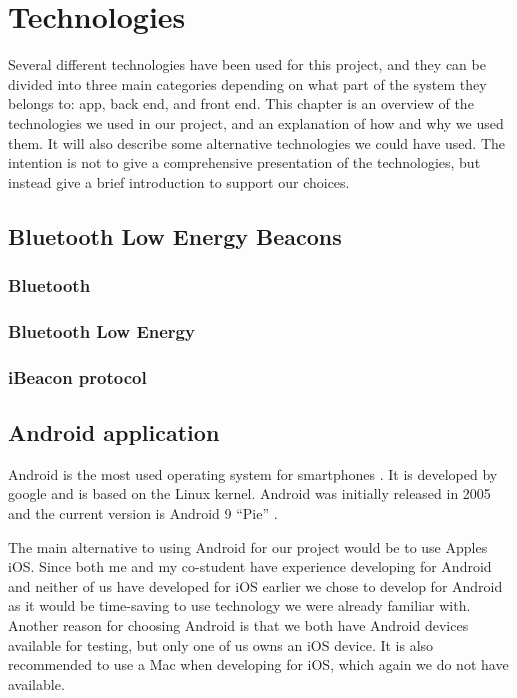 \documentclass[../Main/thesis.tex]{subfiles}
\begin{document}
\chapter{Technologies}
\label{ch:technologies}

Several different technologies have been used for this project, and they can be divided into three main categories depending on what part of the system they belongs to: app, back end, and front end.
This chapter is an overview of the technologies we used in our project, and an explanation of how and why we used them.
It will also describe some alternative technologies we could have used.
The intention is not to give a comprehensive presentation of the technologies, but instead give a brief introduction to support our choices.

\section{Bluetooth Low Energy Beacons}

\subsection{Bluetooth}

\subsection{Bluetooth Low Energy}

\subsection{iBeacon protocol}

\section{Android application}
Android is the most used operating system for smartphones \citep{osmarketshare}. 
It is developed by google and is based on the Linux kernel.
Android was initially released in 2005 \citep{Morrill2008a} and the current version is Android 9 ``Pie'' \cite{Samat2018}.

The main alternative to using Android for our project would be to use Apples iOS.
Since both me and my co-student have experience developing for Android and neither of us have developed for iOS earlier we chose to develop for Android as it would be time-saving to use technology we were already familiar with.
Another reason for choosing Android is that we both have Android devices available for testing, but only one of us owns an iOS device.
It is also recommended to use a Mac when developing for iOS, which again we do not have available.
\end{document}
